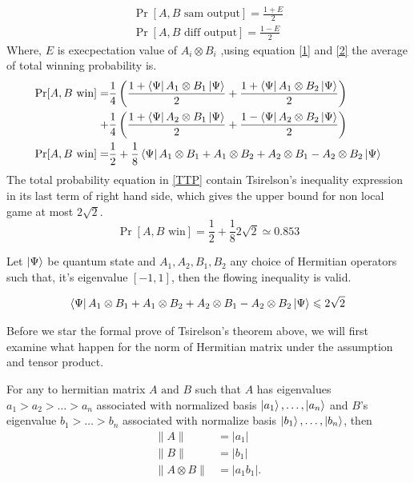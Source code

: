 
\begin{align}
\Pr[A,B \text{ sam output}]=\frac{1+E}{2}\label{1}\\
\Pr[A,B \text{ diff output}]=\frac{1-E}{2}\label{2}
\end{align}
Where, $E$ is execpectation value of $A_i\otimes B_i$ ,using equation \ref{1} and \ref{2} the average of  total  winning probability is.
\begin{align}\label{TTP}
\Pr[A,B \text{ win}]=&\frac{1}{4}\left(\frac{1+\bra{\Psi}A_1\otimes B_1\ket{\Psi}}{2}
+\frac{1+\bra{\Psi}A_1\otimes B_2\ket{\Psi}}{2}\right)\nonumber\\
+&\frac{1}{4}\left(\frac{1+\bra{\Psi}A_2\otimes B_1\ket{\Psi}}{2}+\frac{1-\bra{\Psi}A_2\otimes B_2\ket{\Psi}}{2}\right)\nonumber\\
\Pr[A,B \text{ win}]=&\frac{1}{2}+\frac{1}{8}\bra{\Psi}A_1\otimes B_1+ A_1\otimes B_2+A_2\otimes B_1 -A_2\otimes B_2\ket{\Psi}
\end{align}
The total probability equation in \ref{TTP} contain  Tsirelson’s inequality expression in its last term of right hand side, which gives the upper bound for non local  game at most $2\sqrt{2}$.
\begin{equation}
\Pr[A,B \text{ win}]=\frac{1}{2}+\frac{1}{8} 2\sqrt{2} \simeq 0.853
\end{equation}
\begin{theorem}


Let $\ket{\Psi}$ be quantum state and $A_1,A_2, B_1,B_2$ any choice of Hermitian operators such that, it's eigenvalue $\left[-1,1\right]$, then the flowing  inequality is valid.

\begin{align}
\bra{\Psi}A_1\otimes B_1+ A_1\otimes B_2+A_2\otimes B_1 -A_2\otimes B_2\ket{\Psi}\leqslant 2\sqrt{2}\label{TE}
\end{align}

\end{theorem}


Before we star the formal prove of Tsirelson’s theorem above, we will first examine what happen for the norm of Hermitian matrix under the assumption and tensor product.
\begin{prop}\label{prop2}
For any to hermitian  matrix $A\text{ and }B$ such that $A$ has eigenvalues $a_1>a_2>\ldots> a_n$  associated with normalized basis $\ket{a_1},\ldots,\ket{a_n}$  and $B$'s eigenvalue $b_1>\ldots >b_n$ associated with normalize basis $\ket{b_1},\ldots,\ket{b_n}$, then 
\begin{align*}
\|A\|&=|a_1|\\
\|B\|&=|b_1|\\
\|A\otimes B\|&=|a_1 b_1|.
\end{align*}
\end{prop}

